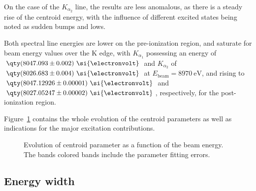 On the case of the $K_{\alpha_2}$ line, the results are less anomalous, as there is a steady rise of the centroid energy, with the influence of different excited states being noted as sudden bumps and lows.

Both spectral line energies are lower on the pre-ionization region, and saturate for beam energy values over the K edge, with $K_{\alpha_1}$ possessing an energy of $\qty(8047.093\pm0.002)\ \si{\electronvolt}$ and $K_{\alpha_2}$ of $\qty(8026.683\pm0.004)\ \si{\electronvolt}$   at $E_{\text{beam}}=8970\ \si{\electronvolt}$, and rising to $\qty(8047.12926 \pm 0.00001)\ \si{\electronvolt}$ and $\qty(8027.05247 \pm 0.00002)\ \si{\electronvolt}$, respectively, for the post-ionization region.

Figure~\ref{fig:centroid} contains the whole evolution of the centroid parameters as well as indications for the major excitation contributions.

\begin{figure}[h!]
    \centering
    \caption{Evolution of centroid parameter as a function of the beam energy. The bands colored bands include the parameter fitting errors.}\label{fig:centroid}
\end{figure}

\subsection{Energy width}

